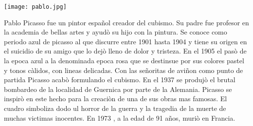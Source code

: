 \begin{center}
  \texttt{[image: pablo.jpg]}
\end{center}

Pablo Picasso fue un pintor español creador del cubismo. Su padre fue profesor en la academia de bellas artes y ayudò su hijo con la pintura.
Se conoce como periodo azul de picasso al que discurre entre 1901 hasta 1904 y tiene su origen en el suicidio de su amigo que lo dejò lleno de dolor y tristeza.
En el 1905 el pasò de la epoca azul a la denominada epoca rosa que se destinsue por sus colores pastel y tonos càlidos, con lineas delicadas.
Con las señoritas de aviñon como punto de partida Picasso acabò formulando el cubismo.
En el 1937 se produjò el brutal bombardeo de la localidad de Guernica por parte de la Alemania.
Picasso se inspirò en este hecho para la creaciòn de una de sus obras mas famosas.
El cuadro simboliza dodo ul horror de la guerra y la tragedia de la muerte de muchas victimas inocentes.
En 1973 , a la edad de 91 años, muriò en Francia.
